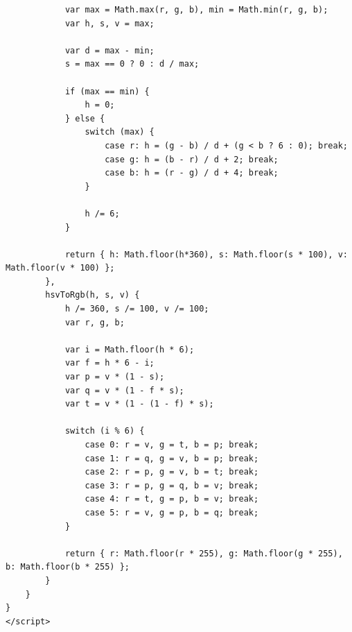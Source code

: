 \documentclass[oneside,14pt]{extarticle}
\begin{document}
\begin{normalsize}
\begin{tiny}
\begin{lstlisting}
			var max = Math.max(r, g, b), min = Math.min(r, g, b);
			var h, s, v = max;
			
			var d = max - min;
			s = max == 0 ? 0 : d / max;
			
			if (max == min) {
				h = 0;
			} else {
				switch (max) {
					case r: h = (g - b) / d + (g < b ? 6 : 0); break;
					case g: h = (b - r) / d + 2; break;
					case b: h = (r - g) / d + 4; break;
				}
				
				h /= 6;
			}
			
			return { h: Math.floor(h*360), s: Math.floor(s * 100), v: Math.floor(v * 100) };
		},
		hsvToRgb(h, s, v) {
			h /= 360, s /= 100, v /= 100;
			var r, g, b;
			
			var i = Math.floor(h * 6);
			var f = h * 6 - i;
			var p = v * (1 - s);
			var q = v * (1 - f * s);
			var t = v * (1 - (1 - f) * s);
			
			switch (i % 6) {
				case 0: r = v, g = t, b = p; break;
				case 1: r = q, g = v, b = p; break;
				case 2: r = p, g = v, b = t; break;
				case 3: r = p, g = q, b = v; break;
				case 4: r = t, g = p, b = v; break;
				case 5: r = v, g = p, b = q; break;
			}
			
			return { r: Math.floor(r * 255), g: Math.floor(g * 255), b: Math.floor(b * 255) };
		}
	}
}
</script>


\end{lstlisting}
\end{tiny}
\end{normalsize}
\end{document}
